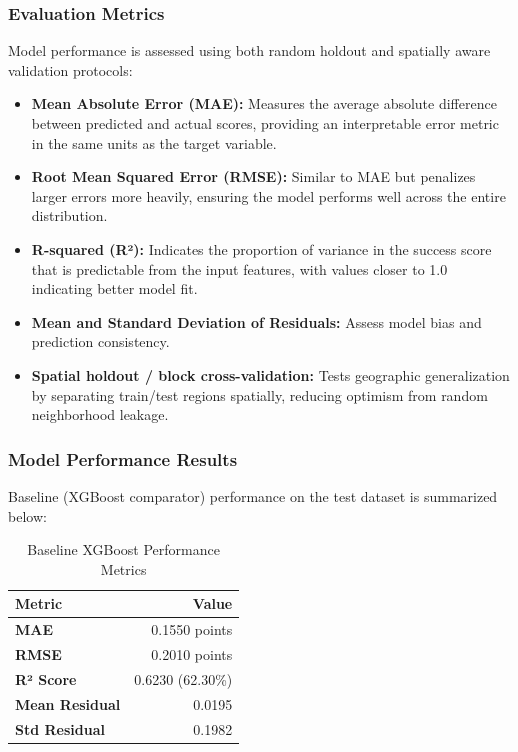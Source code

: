 \subsubsection{Evaluation Metrics}
Model performance is assessed using both random holdout and spatially aware validation protocols:
\begin{itemize}
	\item \textbf{Mean Absolute Error (MAE):} Measures the average absolute difference between predicted and actual scores, providing an interpretable error metric in the same units as the target variable.
	\item \textbf{Root Mean Squared Error (RMSE):} Similar to MAE but penalizes larger errors more heavily, ensuring the model performs well across the entire distribution.
	\item \textbf{R-squared (R²):} Indicates the proportion of variance in the success score that is predictable from the input features, with values closer to 1.0 indicating better model fit.
	\item \textbf{Mean and Standard Deviation of Residuals:} Assess model bias and prediction consistency.
	\item \textbf{Spatial holdout / block cross-validation:} Tests geographic generalization by separating train/test regions spatially, reducing optimism from random neighborhood leakage.
\end{itemize}

\subsubsection{Model Performance Results}
Baseline (XGBoost comparator) performance on the test dataset is summarized below:

\begin{table}[htbp]
\centering
\begin{tabular}{|l|r|}
	\hline
	\textbf{Metric} & \textbf{Value} \\
	\hline
	\textbf{MAE} & 0.1550 points \\
	\textbf{RMSE} & 0.2010 points \\
	\textbf{R² Score} & 0.6230 (62.30\%) \\
	\textbf{Mean Residual} & 0.0195 \\
	\textbf{Std Residual} & 0.1982 \\
	\hline
\end{tabular}
\caption{Baseline XGBoost Performance Metrics}
\label{tab:model-performance-xgboost}
\end{table}

